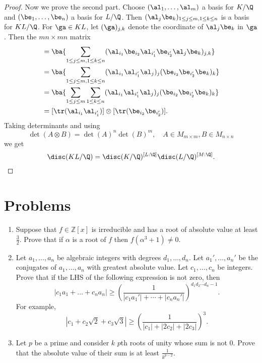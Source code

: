 \begin{proof}
Now we prove the second part. Choose $(\al_1,\ldots, \al_m)$ a basis for $K/\Q$ and $(\be_1,\ldots, \be_n)$ a basis for $L/\Q$. Then $(\al_j\be_k)_{1\le j\le m,1\le k\le n}$ is a basis for $KL/\Q$. For $\ga\in KL$, let $(\ga)_{j,k}$ denote the coordinate of $\al_j\be_k$ in $\ga$. Then the $mn\times mn$ matrix
\begin{align*}
[\tr(\al_{i_1}\be_{i_2}\al_{i_1'}\be_{i_2'})]
&=\ba{\sum_{1\le j\le m,1\le k\le n} (\al_{i_1}\be_{i_2}\al_{i_1'}\be_{i_2'}\al_j\be_k)_{j,k}}\\
&=\ba{\sum_{1\le j\le m,1\le k\le n} (\al_{i_1}\al_{i_1'}\al_j)_j(\be_{i_2}\be_{i_2'}\be_k)_{k}}\\
&=\ba{\sum_{1\le j\le m} \sum_{1\le k\le n} (\al_{i_1}\al_{i_1'}\al_j)_j(\be_{i_2}\be_{i_2'}\be_k)_{k}}\\
&=
[\tr(\al_{i_1}\al_{i_1'})]\otimes[\tr(\be_{i_2}\be_{i_2'})].
\end{align*}
Taking determinants and using 
\[
\det(A\otimes B)=\det(A)^n\det(B)^m,\quad A\in M_{m\times m},B\in M_{n\times n}
\]
we get
\[
\disc(KL/\Q)=\disc(K/\Q)^{[L:\Q]}\disc(L/\Q)^{[M:\Q]}.
\]
\end{proof}

\section{Problems}
\begin{enumerate}
\item Suppose that $f\in\mathbb{Z}[x]$ is irreducible and has a root of absolute value at least $\frac 32$. Prove that if $\alpha$ is a root of $f$ then $f(\alpha^3+1)\neq 0$.

\item Let $a_1,\ldots, a_n$ be algebraic integers with degrees $d_1,\ldots, d_n$. Let $a_1',\ldots, a_n'$ be the conjugates of $a_1,\ldots, a_n$ with greatest absolute value. Let $c_1,\ldots, c_n$ be integers. Prove that if the LHS of the following expression is not zero, then
\[|c_1a_1+\ldots+c_na_n|\geq\left(\frac{1}{|c_1a_1'|+\cdots+|c_na_n'|}\right)^{d_1d_2\cdots d_n-1}.\]
For example, 
\[|c_1+c_2\sqrt{2}+c_3\sqrt{3}|\geq \left(\frac{1}{|c_1|+|2c_2|+|2c_3|}\right)^{3}.\]

\item Let $p$ be a prime and consider $k$ $p$th roots of unity whose sum is not 0. Prove that the absolute value of their sum is at least $\frac{1}{k^{p-2}}$.
\end{enumerate}

